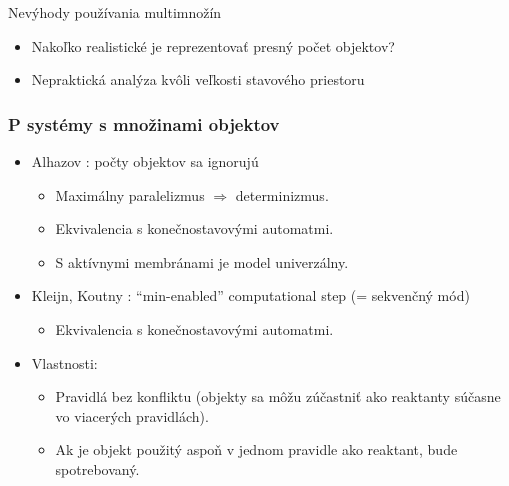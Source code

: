 \begin{frame}[t]{Nevýhody používania multimnožín}
  \begin{itemize}
    \item Nakoľko realistické je reprezentovať presný počet objektov?
    \item Nepraktická analýza kvôli veľkosti stavového priestoru
  \end{itemize}
\end{frame}

\begin{frame}[t]\frametitle{P systémy s množinami objektov}
  \begin{itemize}
    \item Alhazov \cite{Alhazov05WithoutMultiplicities}: počty objektov sa ignorujú
    \pause
    \begin{itemize}
      \item Maximálny paralelizmus $\Rightarrow$ determinizmus.
      \pause
      \item Ekvivalencia s konečnostavovými automatmi.
      \pause
      \item S aktívnymi membránami je model univerzálny.
      \pause
    \end{itemize}
    \item Kleijn, Koutny \cite{Kleijn11SetMembrane}: ``min-enabled'' computational step (= sekvenčný mód)
    \pause
    \begin{itemize}
      \item Ekvivalencia s konečnostavovými automatmi.
    \end{itemize}
    \pause
    \item Vlastnosti:
    \begin{itemize}
      \item Pravidlá bez konfliktu (objekty sa môžu zúčastniť ako reaktanty súčasne vo viacerých pravidlách).
      \item Ak je objekt použitý aspoň v jednom pravidle ako reaktant, bude spotrebovaný.
    \end{itemize}
  \end{itemize}
\end{frame}
\note{}

